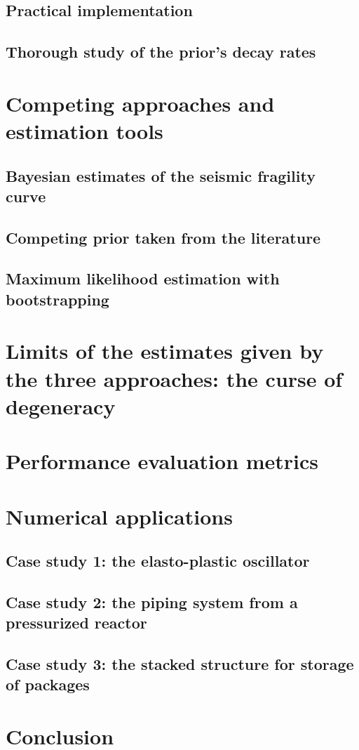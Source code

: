     \subsection{Practical implementation}



    \subsection{Thorough study of the prior's decay rates}




\section{Competing approaches and estimation tools}



    \subsection{Bayesian estimates of the seismic fragility curve}

    \subsection{Competing prior taken from the literature}

    \subsection{Maximum likelihood estimation with bootstrapping}




\section{Limits of the estimates given by the three approaches: the curse of degeneracy}


\section{Performance evaluation metrics}



\section{Numerical applications}


\subsection{Case study 1: the elasto-plastic oscillator}

\subsection{Case study 2: the piping system from a pressurized reactor}

\subsection{Case study 3: the stacked structure for storage of packages}



\section{Conclusion}

